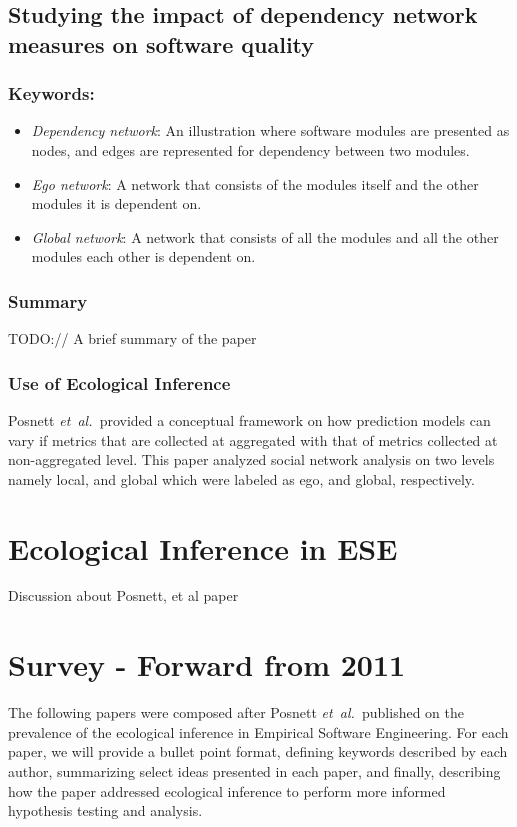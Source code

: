 \documentclass{sig-alternate-05-2015}
\newcommand{\etal}{\mbox{\emph{et al.\ }}}
\begin{document}
\subsection{Studying the impact of dependency network measures on software quality \cite{Nguyen:2010}}

\subsubsection{Keywords:}
\begin{itemize}
\item \emph{Dependency network}:  An illustration where software modules are presented as nodes, and edges are represented for dependency between two modules.
\item \emph{Ego network}:  A network that consists of the modules itself and the other modules it is dependent on.
\item \emph{Global network}: A network that consists of all the modules and all the other modules each other is dependent on.
\end{itemize} 

\subsubsection{Summary}
TODO:// A brief summary of the paper

\subsubsection{Use of Ecological Inference}
Posnett \etal provided a conceptual framework on how prediction models can vary if metrics that are collected at aggregated with that of metrics collected at non-aggregated level. This paper analyzed social network analysis on two levels namely local, and global which were labeled as ego, and global, respectively.


\section{Ecological Inference in ESE}
Discussion about Posnett, et al paper


\section{Survey - Forward from 2011}
The following papers were composed after Posnett \etal published on the prevalence of the ecological inference in Empirical Software Engineering.  For each paper, we will provide a bullet point format, defining keywords described by each author, summarizing select ideas presented in each paper, and finally, describing how the paper addressed ecological inference to perform more informed hypothesis testing and analysis.
\end{document}
